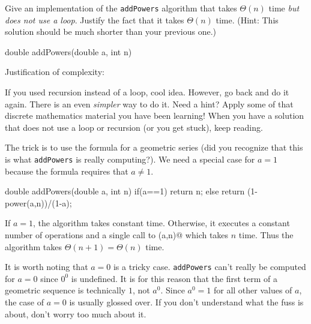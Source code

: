\newpage %

\begin{exer}
Give an implementation of the \verb+addPowers+ algorithm that takes $\Theta(n)$ time
{\em but does not use a loop}.  Justify the fact that it takes $\Theta(n)$ time.
(Hint:  This solution should be much shorter than your previous one.)
\begin{code}
	  double addPowers(double a, int n) {
	     
	     
	     
	     
	     
	     
	     
	     
	     
	     
	     
	     
	     
	     
	  }
\end{code}
Justification of complexity:

\vspace*{1.25in}
\begin{answer}
If you used recursion instead of a loop, cool idea.  However, go back and do it again.
There is an even {\em simpler} way to do it.  Need a hint?  Apply some of that
discrete mathematics material you have been learning!  When you have a solution that
does not use a loop or recursion (or you get stuck), keep reading.

The trick is to use the formula for a
geometric series (did you recognize that this is what \verb+addPowers+ is really computing?).  
We need a special case for $a=1$ because the 
formula requires that $a\neq 1$. 

\begin{code}
	  double addPowers(double a, int n) {
	      if(a==1) {
	          return n;
	      } else {
	          return (1-power(a,n))/(1-a);
	      }
	  }
\end{code} 

If $a=1$, the algorithm takes constant time.
Otherwise, it executes a constant number of operations and a single call
to \verb@power(a,n)@ which takes $n$ time.
Thus the algorithm takes $\Theta(n+1)=\Theta(n)$ time.

It is worth noting that $a=0$ is a tricky case.
\verb+addPowers+ can't really be computed for $a=0$ since $0^0$ is undefined.
It is for this reason that the first term of a geometric sequence is technically $1$, not $a^0$.
Since $a^0=1$ for all other values of $a$, the case of $a=0$ is usually glossed over.
If you don't understand what the fuss is about, don't worry too much about it.
\end{answer} 
\end{exer}

